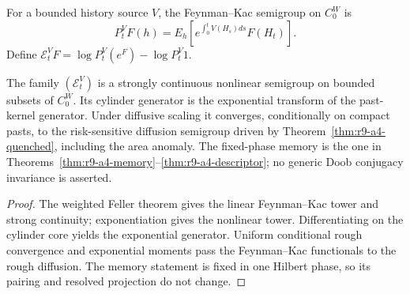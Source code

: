 For a bounded history source $V$, the Feynman--Kac semigroup on $C_0^W$ is
\[
 P_t^VF(h)=E_h\left[e^{\int_0^tV(H_s)ds}F(H_t)\right].
\]
Define $\mathcal E_t^VF=\log P_t^V(e^F)-\log P_t^V1$.

\begin{theorem}
\label{thm:r9-a4-pressure}
The family $(\mathcal E_t^V)$ is a strongly continuous nonlinear semigroup on
bounded subsets of $C_0^W$.  Its cylinder generator is the exponential
transform of the past-kernel generator.  Under diffusive scaling it converges,
conditionally on compact pasts, to the risk-sensitive diffusion semigroup
driven by Theorem~\ref{thm:r9-a4-quenched}, including the area anomaly.
The fixed-phase memory is the one in
Theorems~\ref{thm:r9-a4-memory}--\ref{thm:r9-a4-descriptor}; no generic Doob
conjugacy invariance is asserted.
\end{theorem}

\begin{proof}
The weighted Feller theorem gives the linear Feynman--Kac tower and strong
continuity; exponentiation gives the nonlinear tower.  Differentiating on the
cylinder core yields the exponential generator.  Uniform conditional rough
convergence and exponential moments pass the Feynman--Kac functionals to the
rough diffusion.  The memory statement is fixed in one Hilbert phase, so its
pairing and resolved projection do not change.
\end{proof}
